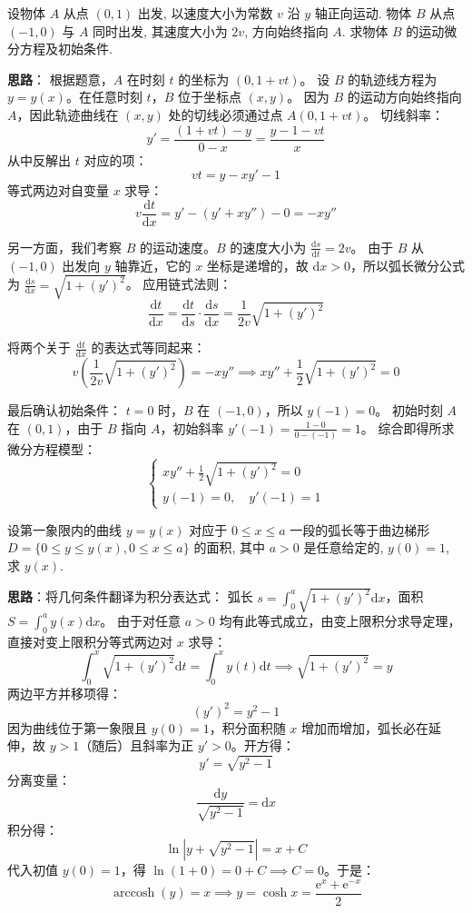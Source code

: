\documentclass[lang=cn,11pt]{elegantbook}
\begin{document}
\begin{exercise}
设物体 $A$ 从点 $(0,1)$ 出发, 以速度大小为常数 $v$ 沿 $y$ 轴正向运动. 物体 $B$ 从点 $(-1,0)$ 与 $A$ 同时出发, 其速度大小为 $2v$, 方向始终指向 $A$. 求物体 $B$ 的运动微分方程及初始条件.
\end{exercise}
\begin{solution}
\textbf{思路}：
根据题意，$A$ 在时刻 $t$ 的坐标为 $(0, 1+vt)$。
设 $B$ 的轨迹线方程为 $y=y(x)$。在任意时刻 $t$，$B$ 位于坐标点 $(x,y)$。
因为 $B$ 的运动方向始终指向 $A$，因此轨迹曲线在 $(x,y)$ 处的切线必须通过点 $A(0, 1+vt)$。
切线斜率：
\[
y' = \frac{(1+vt) - y}{0 - x} = \frac{y - 1 - vt}{x}
\]
从中反解出 $t$ 对应的项：
\[
vt = y - x y' - 1
\]
等式两边对自变量 $x$ 求导：
\[
v \frac{\mathrm{d}t}{\mathrm{d}x} = y' - (y' + x y'') - 0 = -xy''
\]

另一方面，我们考察 $B$ 的运动速度。$B$ 的速度大小为 $\frac{\mathrm{d}s}{\mathrm{d}t} = 2v$。
由于 $B$ 从 $(-1,0)$ 出发向 $y$ 轴靠近，它的 $x$ 坐标是递增的，故 $\mathrm{d}x > 0$，所以弧长微分公式为 $\frac{\mathrm{d}s}{\mathrm{d}x} = \sqrt{1+(y')^2}$。
应用链式法则：
\[
\frac{\mathrm{d}t}{\mathrm{d}x} = \frac{\mathrm{d}t}{\mathrm{d}s} \cdot \frac{\mathrm{d}s}{\mathrm{d}x} = \frac{1}{2v} \sqrt{1+(y')^2}
\]

将两个关于 $\frac{\mathrm{d}t}{\mathrm{d}x}$ 的表达式等同起来：
\[
v \left( \frac{1}{2v} \sqrt{1+(y')^2} \right) = -xy'' \implies xy'' + \frac{1}{2}\sqrt{1+(y')^2} = 0
\]

最后确认初始条件：
$t=0$ 时，$B$ 在 $(-1,0)$，所以 $y(-1) = 0$。
初始时刻 $A$ 在 $(0,1)$，由于 $B$ 指向 $A$，初始斜率 $y'(-1) = \frac{1-0}{0-(-1)} = 1$。
综合即得所求微分方程模型：
\[
\begin{cases}
xy'' + \frac{1}{2}\sqrt{1+(y')^2} = 0 \\
y(-1) = 0, \quad y'(-1) = 1
\end{cases}
\]
\end{solution}

\begin{exercise}[积分方程求导转化法]
设第一象限内的曲线 $y=y(x)$ 对应于 $0\leqslant x\leqslant a$ 一段的弧长等于曲边梯形 $D=\{0\leqslant y\leqslant y(x),0\leqslant x\leqslant a\}$ 的面积, 其中 $a>0$ 是任意给定的, $y(0)=1$, 求 $y(x)$.
\end{exercise}
\begin{solution}
\textbf{思路}：将几何条件翻译为积分表达式：
弧长 $s = \int_0^a \sqrt{1+(y')^2}\mathrm{d}x$，面积 $S = \int_0^a y(x)\mathrm{d}x$。
由于对任意 $a>0$ 均有此等式成立，由变上限积分求导定理，直接对变上限积分等式两边对 $x$ 求导：
\[
\int_0^x \sqrt{1+(y')^2}\mathrm{d}t = \int_0^x y(t)\mathrm{d}t \implies \sqrt{1+(y')^2} = y
\]
两边平方并移项得：
\[
(y')^2 = y^2 - 1
\]
因为曲线位于第一象限且 $y(0)=1$，积分面积随 $x$ 增加而增加，弧长必在延伸，故 $y > 1$（随后）且斜率为正 $y'>0$。开方得：
\[
y' = \sqrt{y^2-1}
\]
分离变量：
\[
\frac{\mathrm{d}y}{\sqrt{y^2-1}} = \mathrm{d}x
\]
积分得：
\[
\ln|y+\sqrt{y^2-1}| = x + C
\]
代入初值 $y(0)=1$，得 $\ln(1+0) = 0+C \implies C=0$。于是：
\[
\operatorname{arccosh}(y) = x \implies \boxed{y = \cosh x = \frac{\mathrm{e}^x + \mathrm{e}^{-x}}{2}}
\]
\end{solution}
\end{document}
